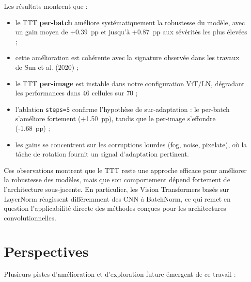 \documentclass[12pt,a4paper]{report}
\begin{document}
	Les résultats montrent que :
	\begin{itemize}
		\item le TTT \textbf{per-batch} améliore systématiquement la robustesse du modèle, avec un gain moyen de +0.39~pp et jusqu’à +0.87~pp aux sévérités les plus élevées ;
		\item cette amélioration est cohérente avec la signature observée dans les travaux de Sun et al. (2020) ;
		\item le TTT \textbf{per-image} est instable dans notre configuration ViT/LN, dégradant les performances dans 46 cellules sur 70 ;
		\item l’ablation \texttt{steps=5} confirme l’hypothèse de sur-adaptation : le per-batch s’améliore fortement (+1.50~pp), tandis que le per-image s’effondre (-1.68~pp) ;
		\item les gains se concentrent sur les corruptions lourdes (fog, noise, pixelate), où la tâche de rotation fournit un signal d’adaptation pertinent.
	\end{itemize}
	
	Ces observations montrent que le TTT reste une approche efficace pour améliorer la robustesse des modèles, mais que son comportement dépend fortement de l’architecture sous-jacente.  
	En particulier, les Vision Transformers basés sur LayerNorm réagissent différemment des CNN à BatchNorm, ce qui remet en question l’applicabilité directe des méthodes conçues pour les architectures convolutionnelles.
	
	\section{Perspectives}
	
	Plusieurs pistes d’amélioration et d’exploration future émergent de ce travail :
	
\end{document}
